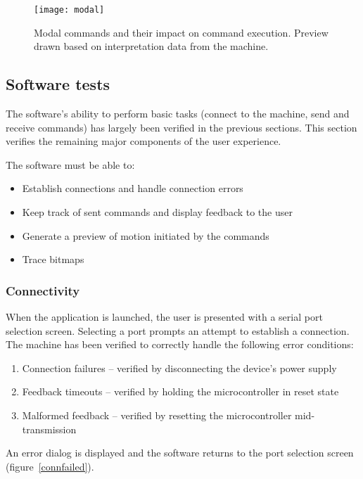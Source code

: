 \begin{figure}[ht]
    \begin{center}
        \texttt{[image: modal]}
        \caption{Modal commands and their impact on command execution. Preview
        drawn based on interpretation data from the machine.}
        \label{modals}
    \end{center}
\end{figure}

\clearpage
\subsection{Software tests}

The software's ability to perform basic tasks (connect to the machine,
send and receive commands) has largely been verified in the previous sections.
This section verifies the remaining major components of the user experience.

The software must be able to:
\begin{itemize}
    \item Establish connections and handle connection errors
    \item Keep track of sent commands and display feedback to the user
    \item Generate a preview of motion initiated by the commands
    \item Trace bitmaps
\end{itemize}

\subsubsection{Connectivity}

When the application is launched, the user is presented with a serial port
selection screen. Selecting a port prompts an attempt to establish a connection.
The machine has been verified to correctly handle the following error
conditions:
\begin{enumerate}
    \item Connection failures -- verified by disconnecting the device's power
    supply
    \item Feedback timeouts -- verified by holding the microcontroller in reset
    state
    \item Malformed feedback -- verified by resetting the microcontroller
    mid-transmission
\end{enumerate}
An error dialog is displayed and the software returns to the port selection
screen (figure~\ref{connfailed}).

